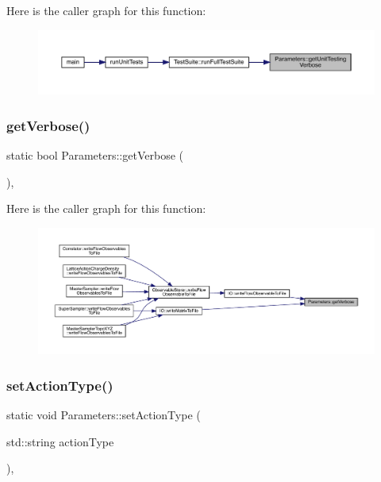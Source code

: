 Here is the caller graph for this function\+:
\nopagebreak
\begin{figure}[H]
\begin{center}
\leavevmode
\includegraphics[width=350pt]{class_parameters_a2645617063e170828a3da439094ab626_icgraph}
\end{center}
\end{figure}
\mbox{\label{class_parameters_a07453f20719f54f9fd6f72d311638b39}} 
\subsubsection{\texorpdfstring{getVerbose()}{getVerbose()}}
{\footnotesize\ttfamily static bool Parameters\+::get\+Verbose (\begin{DoxyParamCaption}{ }\end{DoxyParamCaption})\hspace{0.3cm}{\ttfamily [inline]}, {\ttfamily [static]}}

Here is the caller graph for this function\+:
\nopagebreak
\begin{figure}[H]
\begin{center}
\leavevmode
\includegraphics[width=350pt]{class_parameters_a07453f20719f54f9fd6f72d311638b39_icgraph}
\end{center}
\end{figure}
\mbox{\label{class_parameters_aa7436b658d07358009b922584798fb6d}} 
\subsubsection{\texorpdfstring{setActionType()}{setActionType()}}
{\footnotesize\ttfamily static void Parameters\+::set\+Action\+Type (\begin{DoxyParamCaption}\item[{std\+::string}]{action\+Type }\end{DoxyParamCaption})\hspace{0.3cm}{\ttfamily [inline]}, {\ttfamily [static]}}

